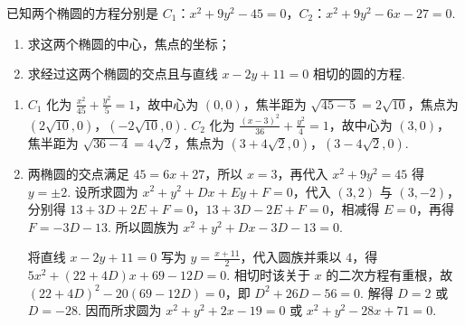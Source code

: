 \documentclass[UTF8,a4paper,oneside,11pt]{ctexbook}
\begin{document}
\begin{problem}

已知两个椭圆的方程分别是 \(C_{1}\)：\(x^{2} + 9y^{2} - 45 = 0\)，\(C_{2}\)：\(x^{2} + 9y^{2} - 6x - 27 = 0\).

\begin{enumerate}
\item 求这两个椭圆的中心，焦点的坐标；
\item 求经过这两个椭圆的交点且与直线 \(x - 2y + 11 = 0\) 相切的圆的方程.
\end{enumerate}
\end{problem}

\begin{solution}
\begin{enumerate}
\item \(C_{1}\) 化为 \(\displaystyle\frac{x^{2}}{45}+\frac{y^{2}}{5}=1\)，故中心为 \((0,0)\)，焦半距为 \(\sqrt{45-5}=2\sqrt{10}\)，焦点为 \((2\sqrt{10},0)\)，\((-2\sqrt{10},0)\). \(C_{2}\) 化为 \(\displaystyle\frac{(x-3)^{2}}{36}+\frac{y^{2}}{4}=1\)，故中心为 \((3,0)\)，焦半距为 \(\sqrt{36-4}=4\sqrt{2}\)，焦点为 \((3+4\sqrt{2},0)\)，\((3-4\sqrt{2},0)\).
\item 两椭圆的交点满足 \(45=6x+27\)，所以 \(x=3\)，再代入 \(x^{2}+9y^{2}=45\) 得 \(y=\pm2\). 设所求圆为 \(x^{2}+y^{2}+Dx+Ey+F=0\)，代入 \((3,2)\) 与 \((3,-2)\)，分别得 \(13+3D+2E+F=0\)，\(13+3D-2E+F=0\)，相减得 \(E=0\)，再得 \(F=-3D-13\). 所以圆族为 \(x^{2}+y^{2}+Dx-3D-13=0\).

将直线 \(x-2y+11=0\) 写为 \(y=\frac{x+11}{2}\)，代入圆族并乘以 \(4\)，得 \(\displaystyle5x^{2}+(22+4D)x+69-12D=0\). 相切时该关于 \(x\) 的二次方程有重根，故 \(\displaystyle(22+4D)^{2}-20(69-12D)=0\)，即 \(D^{2}+26D-56=0\). 解得 \(D=2\) 或 \(D=-28\). 因而所求圆为 \(x^{2}+y^{2}+2x-19=0\) 或 \(x^{2}+y^{2}-28x+71=0\).
\end{enumerate}
\end{solution}

\end{document}
